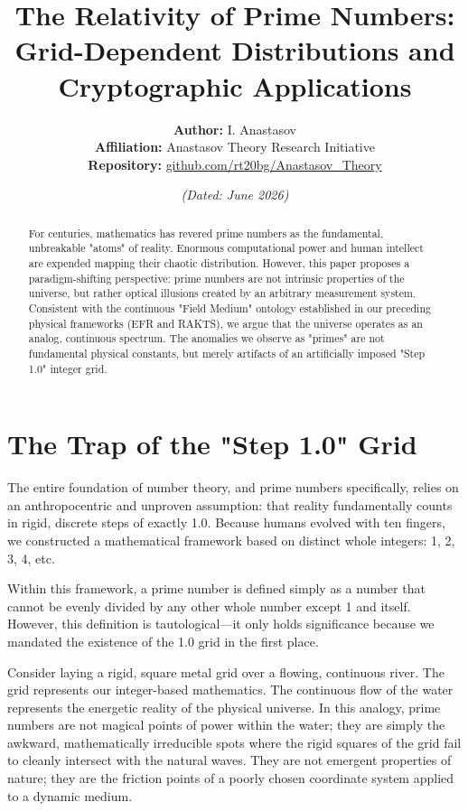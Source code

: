 \documentclass[12pt]{article}
\title{\textbf{The Relativity of Prime Numbers: \\ Grid-Dependent Distributions and Cryptographic Applications}}
\author{\textbf{Author:} I. Anastasov \\
\textbf{Affiliation:} Anastasov Theory Research Initiative \\
\textbf{Repository:} \href{https://github.com/rt20bg/Anastasov_Theory}{github.com/rt20bg/Anastasov\_Theory}}
\date{\textit{(Dated: June 2026)}}
\begin{document}
\maketitle

\begin{abstract}
For centuries, mathematics has revered prime numbers as the fundamental, unbreakable "atoms" of reality. Enormous computational power and human intellect are expended mapping their chaotic distribution. However, this paper proposes a paradigm-shifting perspective: prime numbers are not intrinsic properties of the universe, but rather optical illusions created by an arbitrary measurement system. Consistent with the continuous "Field Medium" ontology established in our preceding physical frameworks (EFR and RAKTS), we argue that the universe operates as an analog, continuous spectrum. The anomalies we observe as "primes" are not fundamental physical constants, but merely artifacts of an artificially imposed "Step 1.0" integer grid.
\end{abstract}

\section{The Trap of the "Step 1.0" Grid}
The entire foundation of number theory, and prime numbers specifically, relies on an anthropocentric and unproven assumption: that reality fundamentally counts in rigid, discrete steps of exactly 1.0. Because humans evolved with ten fingers, we constructed a mathematical framework based on distinct whole integers: 1, 2, 3, 4, etc. 

Within this framework, a prime number is defined simply as a number that cannot be evenly divided by any other whole number except 1 and itself. However, this definition is tautological---it only holds significance because we mandated the existence of the 1.0 grid in the first place.

Consider laying a rigid, square metal grid over a flowing, continuous river. The grid represents our integer-based mathematics. The continuous flow of the water represents the energetic reality of the physical universe. In this analogy, prime numbers are not magical points of power within the water; they are simply the awkward, mathematically irreducible spots where the rigid squares of the grid fail to cleanly intersect with the natural waves. They are not emergent properties of nature; they are the friction points of a poorly chosen coordinate system applied to a dynamic medium.
\end{document}
